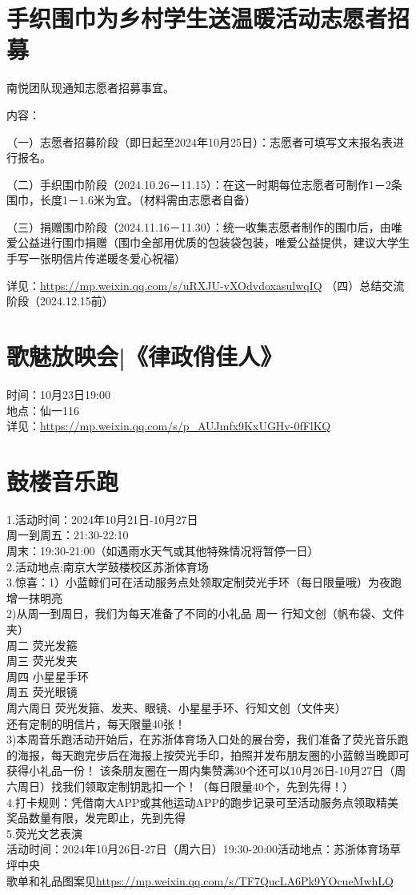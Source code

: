 \documentclass[letterpaper, 12pt]{article}
\begin{document}
\begin{multicols}{2}
\section{手织围巾为乡村学生送温暖活动志愿者招募}
南悦团队现通知志愿者招募事宜。

内容：

（一）志愿者招募阶段（即日起至2024年10月25日）：志愿者可填写文末报名表进行报名。

（二）手织围巾阶段（2024.10.26－11.15）：在这一时期每位志愿者可制作1－2条围巾，长度1－1.6米为宜。（材料需由志愿者自备）

（三）捐赠围巾阶段（2024.11.16－11.30）：统一收集志愿者制作的围巾后，由唯爱公益进行围巾捐赠（围巾全部用优质的包装袋包装，唯爱公益提供，建议大学生手写一张明信片传递暖冬爱心祝福）

详见：\url{https://mp.weixin.qq.com/s/uRXJU-vXOdvdoxasulwqIQ}
（四）总结交流阶段（2024.12.15前）
\section{歌魅放映会|《律政俏佳人》}
时间：10月23日19:00\\
地点：仙一116\\
详见：\url{https://mp.weixin.qq.com/s/p_AUJmfx9KxUGHv-0fFlKQ}
\section{鼓楼音乐跑}
1.活动时间：2024年10月21日-10月27日\\
周一到周五：21:30-22:10\\
周末：19:30-21:00（如遇雨水天气或其他特殊情况将暂停一日）\\
2.活动地点:南京大学鼓楼校区苏浙体育场\\
3.惊喜：1）小蓝鲸们可在活动服务点处领取定制荧光手环（每日限量哦）为夜跑增一抹明亮\\
2)从周一到周日，我们为每天准备了不同的小礼品
周一 行知文创（帆布袋、文件夹）\\
周二 荧光发箍\\
周三 荧光发夹\\
周四 小星星手环\\
周五 荧光眼镜\\
周六周日 荧光发箍、发夹、眼镜、小星星手环、行知文创（文件夹）\\
还有定制的明信片，每天限量40张！\\
3)本周音乐跑活动开始后，在苏浙体育场入口处的展台旁，我们准备了荧光音乐跑的海报，每天跑完步后在海报上按荧光手印，拍照并发布朋友圈的小蓝鲸当晚即可获得小礼品一份！
该条朋友圈在一周内集赞满30个还可以10月26日-10月27日（周六周日）找我们领取定制钥匙扣一个！（每日限量40个，先到先得！）\\
4.打卡规则：凭借南大APP或其他运动APP的跑步记录可至活动服务点领取精美奖品数量有限，发完即止，先到先得~\\
5.荧光文艺表演\\
活动时间：2024年10月26日-27日（周六日）19:30-20:00活动地点：苏浙体育场草坪中央\\
歌单和礼品图案见\url{https://mp.weixin.qq.com/s/TF7QucLA6Pk9YOcueMwhLQ}

\end{multicols} 
\end{document}
